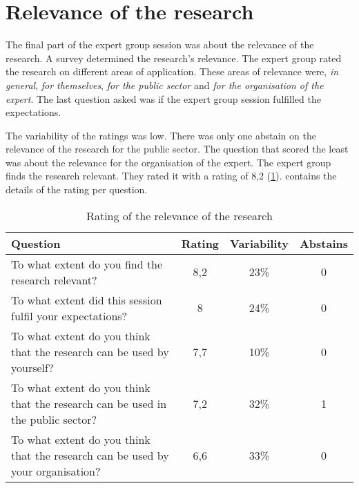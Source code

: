 \section{Relevance of the research}
\label{sec:relevanceofresearch}
The final part of the expert group session was about the relevance of the research. A survey determined the research's relevance. The expert group rated the research on different areas of application. These areas of relevance were, \textit{in general}, \textit{for themselves}, \textit{for the public sector} and \textit{for the organisation of the expert}. The last question asked was if the expert group session fulfilled the expectations.

The variability of the ratings was low. There was only one abstain on the relevance of the research for the public sector. The question that scored the least was about the relevance for the organisation of the expert. The expert group finds the research relevant. They rated it with a rating of 8,2 (\cref{tab:relevanceofresearch}).  contains the details of the rating per question.
\begin{table}[H]
	\centering
	\begin{tabular}{p{}ccc}
		\toprule
		\textbf{Question} & \textbf{Rating} & \textbf{Variability} & \textbf{Abstains} \\
		\midrule
		To what extent do you find the research relevant? & 8,2 & 23\% & 0 \\%
		To what extent did this session fulfil your expectations? & 8 & 24\% & 0 \\%
		To what extent do you think that the research can be used by yourself? & 7,7 & 10\% & 0 \\%
		To what extent do you think that the research can be used in the public sector? & 7,2 & 32\% & 1 \\%
		To what extent do you think that the research can be used by your organisation? & 6,6 & 33\% & 0 \\%
		\bottomrule
	\end{tabular}%
	\caption[Rating of the relevance of the research]{Rating of the relevance of the research}
	\label{tab:relevanceofresearch}%
\end{table}%
